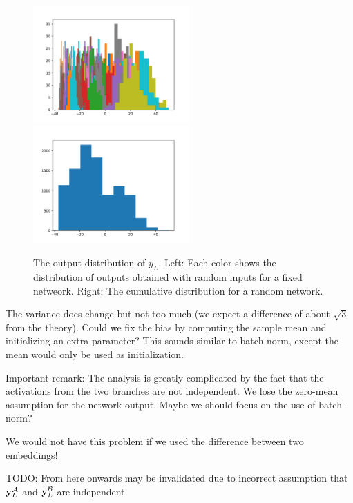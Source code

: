 \begin{figure}[H]
\centering
\includegraphics[width=60mm]{code/siamese_hist_L_5}
\includegraphics[width=60mm]{code/siamese_hist_L_5_ravel}
\caption{
  The output distribution of $y_{L}$.
  Left: Each color shows the distribution of outputs obtained with random inputs for a fixed netweork.
  Right: The cumulative distribution for a random network.
}
\end{figure}

The variance does change but not too much (we expect a difference of about $\sqrt{3}$ from the theory).
Could we fix the bias by computing the sample mean and initializing an extra parameter?
This sounds similar to batch-norm, except the mean would only be used as initialization.

Important remark: The analysis is greatly complicated by the fact that the activations from the two branches are not independent.
We lose the zero-mean assumption for the network output.
Maybe we should focus on the use of batch-norm?

We would not have this problem if we used the difference between two embeddings!

TODO: From here onwards may be invalidated due to incorrect assumption that $\boldsymbol{\mathbf{y}}_{L}^{\mathcal{A}}$ and $\boldsymbol{\mathbf{y}}_{L}^{\mathcal{B}}$ are independent.

